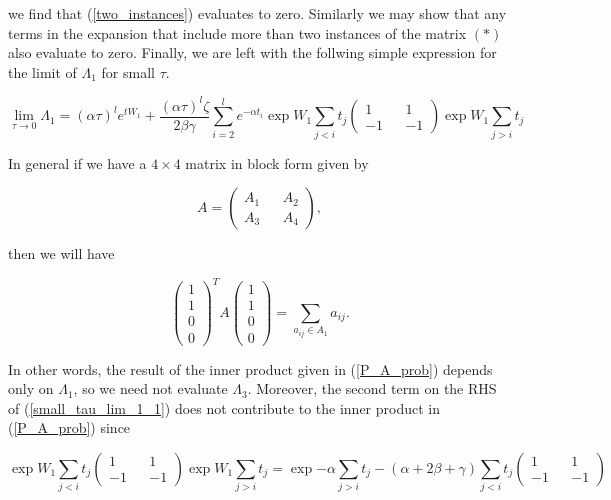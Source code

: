 \documentclass{article}
\begin{document}
we find that (\ref{two_instances}) evaluates to zero. Similarly we may show that any terms in the expansion that include more than two instances of the matrix $(\ast)$ also evaluate to zero. Finally, we are left with the follwing simple expression for the limit of $\Lambda_1$ for small $\tau$.

\begin{equation}\label{small_tau_lim_1_1}
  \lim_{\tau \rightarrow 0} \Lambda_1 = (\alpha \tau)^l e^{tW_1} + \frac{(\alpha\tau)^l\zeta}{2\beta\gamma}\sum_{i=2}^{l} e^{-\alpha t_i} \exp{W_1 \sum_{j<i}t_j}\begin{pmatrix} 1 && 1 \\ -1 && -1 \end{pmatrix} \exp{W_1\sum_{j>i}t_j}
\end{equation}

In general if we have a $4\times 4$ matrix in block form given by

$$A= \begin{pmatrix} A_1 && A_2 \\ A_3 && A_4 \end {pmatrix},$$

then we will have

$$ \begin{pmatrix} 1 \\ 1 \\ 0 \\ 0 \end{pmatrix}^T A \begin{pmatrix} 1 \\ 1 \\ 0 \\ 0 \end{pmatrix} = \sum_{a_{ij} \in A_1}a_{ij}.$$

In other words, the result of the inner product given in (\ref{P_A_prob}) depends only on $\Lambda_1$, so we need not evaluate $\Lambda_3$. Moreover, the second term on the RHS of (\ref{small_tau_lim_1_1}) does not contribute to the inner product in (\ref{P_A_prob}) since

\begin{equation}
  \exp{W_1\sum_{j<i}t_j}\begin{pmatrix} 1 && 1 \\ -1 && -1 \end{pmatrix}\exp{W_1 \sum_{j>i}t_j} =
  \exp{-\alpha\sum_{j>i}t_j - (\alpha+2\beta+\gamma)\sum_{j<i}t_j}\begin{pmatrix} 1 && 1 \\ -1 && -1 \end{pmatrix}
\end{equation}
\end{document}
